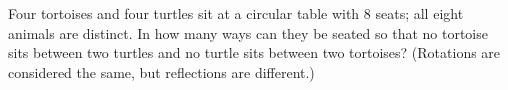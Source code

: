 Four tortoises and four turtles sit at a circular table with $8$ seats; all eight animals are distinct. In how many ways can they be seated so that no tortoise sits between two turtles and no turtle sits between two tortoises? (Rotations are considered the same, but reflections are different.)
